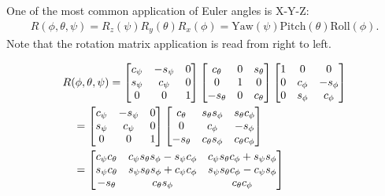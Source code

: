 \documentclass[twocolumn]{article}
\begin{document}
One of the most  common application  of Euler angles is X-Y-Z:
\begin{align}
  R(\phi, \theta, \psi) = R_z(\psi)R_y(\theta)R_x(\phi) = \text{Yaw}(\psi)\text{Pitch}(\theta)\text{Roll}(\phi).
\end{align}
Note that the rotation matrix  application is read  from right  to  left.

\begin{align}
  &R(\phi, \theta, \psi) =  \begin{bmatrix}
  c_\psi & - s_\psi & 0 \\
  s_\psi & c_\psi & 0 \\
  0 & 0 & 1
  \end{bmatrix}
  \begin{bmatrix}
    c_\theta & 0 & s_\theta \\
    0 & 1 & 0 \\
    - s_\theta & 0 & c_\theta
    \end{bmatrix}
    \begin{bmatrix}
      1 & 0 & 0 \\
      0 & c_\phi & - s_\phi \\
      0 & s_\phi & c_\phi
      \end{bmatrix}
\notag\\&\quad
  =\begin{bmatrix}
    c_\psi & - s_\psi & 0 \\
    s_\psi & c_\psi & 0 \\
    0 & 0 & 1
  \end{bmatrix}
            \begin{bmatrix}
              c_\theta & s_\theta s_\phi & s_\theta c_\phi \\
              0 & c_\phi & -s_\phi \\
              -s_\theta & c_\theta s_\phi & c_\theta c_\phi
            \end{bmatrix}
\notag\\&\quad
  = \begin{bmatrix}
    c_\psi c_\theta & c_\psi s_\theta s_\phi - s_\psi c_\phi & c_\psi s_\theta c_\phi+ s_\psi s_\phi \\
    s_\psi c_\theta & s_\psi s_\theta s_\phi + c_\psi c_\phi & s_\psi s_\theta c_\phi - c_\psi s_\phi \\
    -s_\theta & c_\theta s_\phi & c_\theta c_\phi
    \end{bmatrix}
\end{align}
\end{document}
